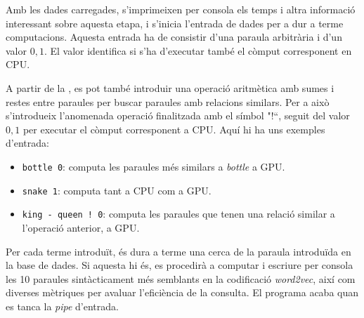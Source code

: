 \documentclass[catalan,10pt,a4paper]{article}
\begin{document}
Amb les dades carregades, s'imprimeixen per consola els temps i altra informació interessant sobre aquesta etapa, i s'inicia l'entrada de dades per a dur a terme computacions. \newline
Aquesta entrada ha de consistir d'una paraula arbitrària i d'un valor ${0,1}$. El valor identifica si s'ha d'executar també el còmput corresponent en CPU.

A partir de la , es pot també introduir una operació aritmètica amb sumes i restes entre paraules per buscar paraules amb relacions similars. Per a això s'introdueix l'anomenada operació finalitzada amb el símbol "!``, seguit del valor ${0,1}$ per executar el còmput corresponent a CPU.
Aquí hi ha uns exemples d'entrada:
\begin{itemize}
	\item \verb|bottle 0|: computa les paraules més similars a \textit{bottle} a GPU.
	\item \verb|snake 1|: computa tant a CPU com a GPU.
	\item \verb|king - queen ! 0|: computa les paraules que tenen una relació similar a l'operació anterior, a GPU.
\end{itemize}
Per cada terme introduït, és dura a terme una cerca de la paraula introduïda en la base de dades. Si aquesta hi és, es procedirà a computar i escriure per consola les 10 paraules sintàcticament més semblants en la codificació \textit{word2vec}, així com diverses mètriques per avaluar l'eficiència de la consulta.
El programa acaba quan es tanca la \textit{pipe} d'entrada.
\end{document}
